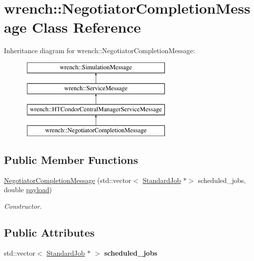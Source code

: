 \hypertarget{classwrench_1_1_negotiator_completion_message}{}\section{wrench\+:\+:Negotiator\+Completion\+Message Class Reference}
\label{classwrench_1_1_negotiator_completion_message}
Inheritance diagram for wrench\+:\+:Negotiator\+Completion\+Message\+:\begin{figure}[H]
\begin{center}
\leavevmode
\includegraphics[height=4.000000cm]{classwrench_1_1_negotiator_completion_message}
\end{center}
\end{figure}
\subsection*{Public Member Functions}
\begin{DoxyCompactItemize}
\item 
\hyperlink{classwrench_1_1_negotiator_completion_message_aece506a0df6a8a5bf7484467f05c9b19}{Negotiator\+Completion\+Message} (std\+::vector$<$ \hyperlink{classwrench_1_1_standard_job}{Standard\+Job} $\ast$$>$ scheduled\+\_\+jobs, double \hyperlink{classwrench_1_1_simulation_message_a914f2732713f7c02898e66f05a7cb8a1}{payload})
\begin{DoxyCompactList}\small\item\em Constructor. \end{DoxyCompactList}\end{DoxyCompactItemize}
\subsection*{Public Attributes}
\begin{DoxyCompactItemize}
\item 
\mbox{\label{classwrench_1_1_negotiator_completion_message_aeaf67aaa5ac0bc830eff59ef6d51d9d5}} 
std\+::vector$<$ \hyperlink{classwrench_1_1_standard_job}{Standard\+Job} $\ast$ $>$ {\bfseries scheduled\+\_\+jobs}
\end{DoxyCompactItemize}

